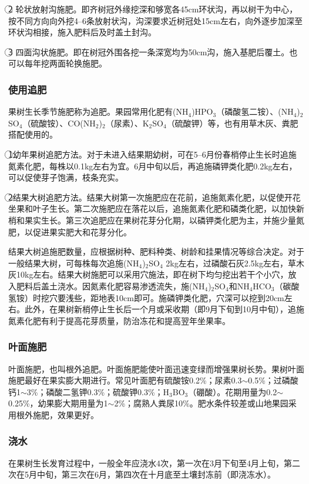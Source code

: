 \documentclass{ctexbook}
\begin{document}
\textcircled{2} 轮状放射沟施肥。即齐树冠外缘挖深和够宽各45cm环状沟，再以树干为中心，按不同方向向外挖4--6条放射状沟，沟深要求近树冠处15cm左右，向外逐步加深至环状沟相接，施入肥料后及时盖土封沟。

\textcircled{3} 四面沟状施肥。即在树冠外围各挖一条深宽均为50cm沟，施入基肥后覆土。也可以每年挖两面轮换施肥。
\subsubsection{使用追肥}
果树生长季节施肥称为追肥。果园常用化肥有(NH$_4$)HPO$_3$（磷酸氢二铵）、(NH$_4$)$_2$SO$_4$（硫酸铵）、CO(NH$_2$)$_2$（尿素）、K$_2$SO$_4$（硫酸钾）等，也有用草木灰、粪肥搭配使用的。

\textcircled{1}幼年果树追肥方法。对于未进入结果期幼树，可在5--6月份春梢停止生长时追施氮素化肥，每株以0.1kg左右为宜。6月中旬以后，再追施磷钾类化肥0.2kg左右，可以促使芽子饱满，枝条充实。

\textcircled{2}结果大树追肥方法。结果大树第一次施肥应在花前，追施氮素化肥，以促使开花坐果和叶子生长。第二次施肥应在落花以后，追施氮素化肥和磷类化肥，以加快新梢和果实生长。第三次追肥应在果树花芽分化期，以磷钾类化肥为主，并施少量氮肥，以促进果实肥大和花芽分化。

结果大树追施肥数量，应根据树种、肥料种类、树龄和挂果情况等综合决定。对于一般结果大树，可每株每次追施(NH$_4$)$_2$SO$_4$ 2kg左右，过磷酸石灰2.5kg左右，草木灰10kg左右。结果大树施肥可以采用穴施法，即在树下均匀挖出若干个小穴，放入肥料后盖土浇水。因氮素化肥容易渗透流失，施(NH$_4$)$_2$SO$_4$和NH$_4$HCO$_3$（碳酸氢铵）时挖穴要浅些，距地表10cm即可。施磷钾类化肥，穴深可以挖到20cm左右。此外，在果树新梢停止生长后一个月或采收期（即9月下旬到10月中旬），追施氮素化肥有利于提高花芽质量，防治冻花和提高翌年坐果率。
\subsubsection{叶面施肥}
叶面施肥，也叫根外追肥。叶面施肥能使叶面迅速变绿而增强果树长势。果树叶面施肥最好在果实膨大期进行。常见叶面肥有硫酸铵0.2\%；尿素0.3$\sim$0.5\%；过磷酸钙1$\sim$3\%；磷酸二氢钾0.3\%；硫酸钾0.3\%；H$_3$BO$_3$（硼酸）。花期用量为0.2$\sim$0.25\%，幼果膨大期用量为1$\sim$2\%；腐熟人粪尿10\%。肥水条件较差或山地果园采用根外施肥，效果更好。
\subsubsection{浇水}
在果树生长发育过程中，一般全年应浇水4次，第一次在3月下旬至4月上旬，第二次在5月中旬，第三次在6月，第四次在十月底至土壤封冻前（即浇冻水）。
\end{document}
